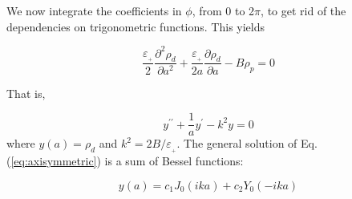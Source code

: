\documentclass[useAMS,8pt,twocolumn]{article}
\newcommand{\pderiv}[2]{\frac{\partial #1}{\partial #2}}
\newcommand{\pderivn}[3]{\frac{\partial^{#3} #1}{\partial #2^{#3}}}
\newcommand{\Eq}[1]{Eq. (\ref{#1})}
\newcommand{\eq}[1]{\Eq{#1}}
\newcommand{\beq}{\begin{equation}}
\newcommand{\eeq}{\end{equation}}
\newcommand{\beqn}{\begin{eqnarray}}
\newcommand{\eeqn}{\end{eqnarray}}
\newcommand{\epsp}{\varepsilon_{_{+}}}
\begin{document}
We now integrate the coefficients in $\phi$, from 0 to 2$\pi$, to get
rid of the dependencies on trigonometric functions. This yields

\beq
\frac{\epsp}{2}\pderivn{\rho_d}{a}{2} +
\frac{\epsp}{2a}\pderiv{\rho_d}{a} - B \rho_p = 0  
\eeq

That is, 

\beq
y^{\prime\prime} + \frac{1}{a}y^\prime - k^2 y = 0 
\label{eq:axisymmetric}
\eeq where $y(a) = \rho_d$ and $k^2 = 2B/\epsp$.  The general solution of \eq{eq:axisymmetric} is a
sum of Bessel functions: 

\beq
y(a) = c_1 J_0 (ika) + c_2 Y_0(-ika) 
\eeq







\end{document}

